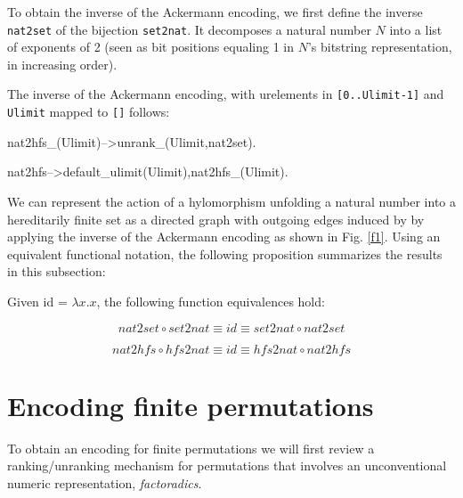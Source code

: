 \documentclass[]{INCLUDES/llncs}
\begin{document}
To obtain the inverse of the Ackermann encoding, we first define the 
inverse {\tt nat2set} of the bijection {\tt set2nat}. It decomposes a natural
number $N$ into a list of exponents of 2 (seen as bit positions equaling 1 
in $N$'s bitstring representation, in increasing order).
The inverse of the  Ackermann encoding, with urelements in {\tt [0..Ulimit-1]}
and {\tt Ulimit} mapped to {\tt []} follows:
\begin{code}
nat2hfs_(Ulimit)-->unrank_(Ulimit,nat2set).

nat2hfs-->default_ulimit(Ulimit),nat2hfs_(Ulimit).
\end{code}
We can represent the action of a hylomorphism unfolding a natural number into
a hereditarily finite set as a directed graph with outgoing edges
induced by by applying the inverse of the Ackermann encoding as shown
in Fig. \ref{f1}.
Using an equivalent functional notation, the following proposition summarizes
the results in this subsection:
\begin{prop}
Given id = $\lambda x.x$, the following function equivalences hold:

\begin{equation}
nat2set \circ set2nat \equiv id \equiv set2nat \circ nat2set
\end{equation}

\begin{equation}
nat2hfs \circ hfs2nat \equiv id \equiv hfs2nat \circ nat2hfs
\end{equation}
\end{prop}

\section{Encoding finite permutations} \label{perm}
To obtain an encoding for finite permutations
we will first review a ranking/unranking mechanism for permutations that
involves an unconventional numeric representation, {\em factoradics}.
\end{document}
